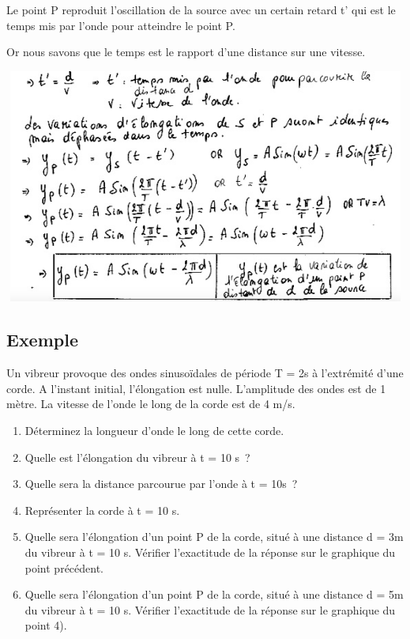 Le point P reproduit l'oscillation de la source avec un certain retard
t' qui est le temps mis par l'onde pour atteindre le point P.

Or nous savons que le temps est le rapport d'une distance sur une
vitesse.

\includegraphics[width=14.152cm,height=7.717cm]{Pictures/100000010000039C0000022244D6A7EE40B9357C.png}

\subsection{Exemple}

Un vibreur provoque des ondes sinusoïdales de période T = 2s à
l'extrémité d'une corde. A l'instant initial, l'élongation est nulle.
L'amplitude des ondes est de 1 mètre. La vitesse de l'onde le long de la
corde est de 4 m/s.

\begin{enumerate}
\item  Déterminez la longueur d'onde le long de cette corde.
\item  Quelle est l'élongation du vibreur à t = 10 s~?
\item  Quelle sera la distance parcourue par l'onde à t = 10s~?
\item  Représenter la corde à t = 10 s.
\item  Quelle sera l'élongation d'un point P de la corde, situé à une
  distance d = 3m du vibreur à t = 10 s.
Vérifier l'exactitude de la réponse sur le graphique du point précédent.
\item  Quelle sera l'élongation d'un point P de la corde, situé à une
  distance d = 5m du vibreur à t = 10 s.
Vérifier l'exactitude de la réponse sur le graphique du point 4).
\end{enumerate}

